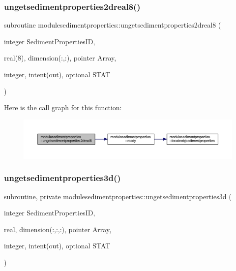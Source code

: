 \subsubsection{\texorpdfstring{ungetsedimentproperties2dreal8()}{ungetsedimentproperties2dreal8()}}
{\footnotesize\ttfamily subroutine modulesedimentproperties\+::ungetsedimentproperties2dreal8 (\begin{DoxyParamCaption}\item[{integer}]{Sediment\+Properties\+ID,  }\item[{real(8), dimension(\+:,\+:), pointer}]{Array,  }\item[{integer, intent(out), optional}]{S\+T\+AT }\end{DoxyParamCaption})\hspace{0.3cm}{\ttfamily [private]}}

Here is the call graph for this function\+:\nopagebreak
\begin{figure}[H]
\begin{center}
\leavevmode
\includegraphics[width=350pt]{namespacemodulesedimentproperties_a1403cdef2dd5dd1114fbe5112f6e064b_cgraph}
\end{center}
\end{figure}
\mbox{\label{namespacemodulesedimentproperties_aee146c5fb6ec7343cd2af683f76043b9}} 
\subsubsection{\texorpdfstring{ungetsedimentproperties3d()}{ungetsedimentproperties3d()}}
{\footnotesize\ttfamily subroutine, private modulesedimentproperties\+::ungetsedimentproperties3d (\begin{DoxyParamCaption}\item[{integer}]{Sediment\+Properties\+ID,  }\item[{real, dimension(\+:,\+:,\+:), pointer}]{Array,  }\item[{integer, intent(out), optional}]{S\+T\+AT }\end{DoxyParamCaption})\hspace{0.3cm}{\ttfamily [private]}}

